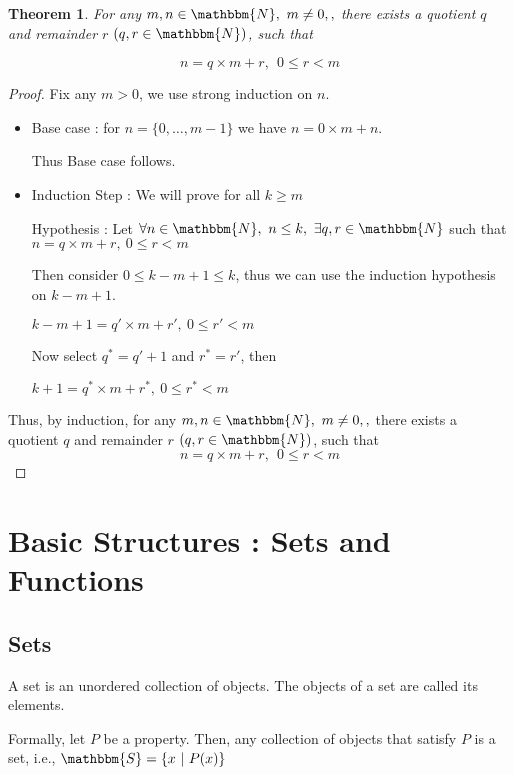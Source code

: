 \documentclass[14pt]{extarticle}
\newcommand{\N}{\mathbbm{N}}
\newcommand{\Sset}{\mathbbm{S}}
\newtheorem{theorem}{Theorem}
\begin{document}
\begin{theorem}
    For any $m, n \in \N, \ m\neq 0, , $ there exists a quotient $q$ and remainder $r$ $(q, r \in \N)$, such that

    \[ n = q\times m+r, \ \ 0 \leq r < m \]
\end{theorem}

\begin{proof}
    Fix any $m > 0$, we use strong induction on $n$.

    \begin{itemize}
        \item Base case : for $n = \{ 0, \dots, m-1 \}$
we have $n = 0 \times m + n$.

        Thus Base case follows.

        \item Induction Step : We will prove for all $k \geq m$

        Hypothesis : Let $\forall n \in \N, \ n \leq k, \ \exists q, r \in \N$ such that\\ $n = q \times m + r, \ 0 \leq r < m$

        Then consider $0 \leq k - m + 1 \leq k$, thus we can use the induction hypothesis on $k -m + 1$.

        $k - m + 1 = q' \times m + r', \ 0 \leq r' < m$

        Now select $q^* = q' + 1$ and $r^* = r'$, then

        $k + 1 = q^* \times m + r^*, \ 0 \leq r^* < m$
    \end{itemize}

    Thus, by induction, for any $m, n \in \N, \ m\neq 0, , $ there exists a quotient $q$ and remainder $r$ $(q, r \in \N)$, such that
    \[ n = q\times m+r, \ \ 0 \leq r < m \]
\end{proof}

\section{Basic Structures : Sets and Functions}

\subsection{Sets}

A set is an unordered collection of objects. The objects of a set are called its elements.

Formally, let $P$ be a property. Then, any collection of objects that satisfy $P$ is a set, i.e., $\Sset = \{ x \ | \ P(x) \}$
\end{document}
